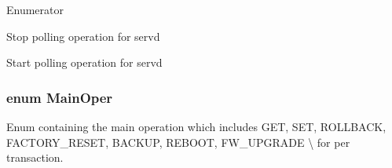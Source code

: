 \begin{Desc}
\item[Enumerator]\par
\begin{description}
\item[{\em 
\hypertarget{group__LIBHELP_gga21d5e8f8cdaa838586b31007df0a950ba4645d70cb9bb2228f230d601f477639d}{A\-C\-T\-I\-O\-N\-\_\-\-S\-T\-O\-P}\label{group__LIBHELP_gga21d5e8f8cdaa838586b31007df0a950ba4645d70cb9bb2228f230d601f477639d}
}]Stop polling operation for servd \item[{\em 
\hypertarget{group__LIBHELP_gga21d5e8f8cdaa838586b31007df0a950bad18d9bd6c0a4eced8d31c7b1c6b9dd16}{A\-C\-T\-I\-O\-N\-\_\-\-S\-T\-A\-R\-T}\label{group__LIBHELP_gga21d5e8f8cdaa838586b31007df0a950bad18d9bd6c0a4eced8d31c7b1c6b9dd16}
}]Start polling operation for servd \end{description}
\end{Desc}
\hypertarget{group__LIBHELP_ga0cdba030aaa0bd18b24dbf19b06877a0}{
\subsubsection[{Main\-Oper}]{\setlength{\rightskip}{0pt plus 5cm}enum {\bf Main\-Oper}}}\label{group__LIBHELP_ga0cdba030aaa0bd18b24dbf19b06877a0}


Enum containing the main operation which includes G\-E\-T, S\-E\-T, R\-O\-L\-L\-B\-A\-C\-K, F\-A\-C\-T\-O\-R\-Y\-\_\-\-R\-E\-S\-E\-T, B\-A\-C\-K\-U\-P, R\-E\-B\-O\-O\-T, F\-W\-\_\-\-U\-P\-G\-R\-A\-D\-E \textbackslash{} for per transaction. 

